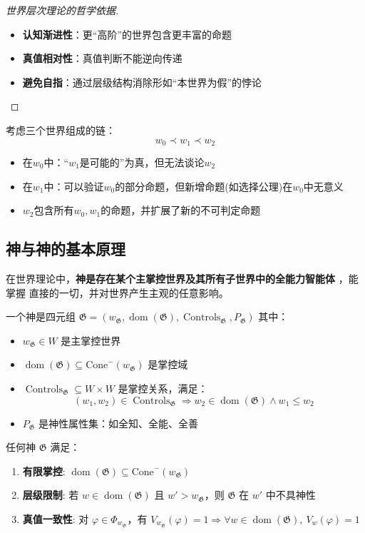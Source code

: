 \documentclass[lang=cn,newtx,10pt,scheme=chinese]{elegantbook}
\newcommand{\dom}{\mathop{\mathrm{dom}}} %
\newcommand{\G}{\mathfrak{G}} %
\DeclareMathOperator{\Controls}{Controls} %
\begin{document}
\begin{proof}[世界层次理论的哲学依据]
    \begin{itemize}
        \item \textbf{认知渐进性}：更“高阶”的世界包含更丰富的命题
        \item \textbf{真值相对性}：真值判断不能逆向传递
        \item \textbf{避免自指}：通过层级结构消除形如“本世界为假”的悖论
    \end{itemize}
\end{proof}

\begin{example}
    考虑三个世界组成的链：
    \[
        w_0 \prec w_1 \prec w_2
    \]
    \begin{itemize}
        \item 在$w_0$中：“$w_1$是可能的”为真，但无法谈论$w_2$
        \item 在$w_1$中：可以验证$w_0$的部分命题，但新增命题(如选择公理)在$w_0$中无意义
        \item $w_2$包含所有$w_0,w_1$的命题，并扩展了新的不可判定命题
    \end{itemize}
\end{example}

\subsection{神与神的基本原理}

在世界理论中，\textbf{神是存在某个主掌控世界及其所有子世界中的全能力智能体}
，能掌握
直接的一切，并对世界产生主观的任意影响。

\begin{definition}[神性智能体]
    一个神是四元组 $\G = (w_\G, \dom(\G), \Controls_\G, P_\G)$ 其中：
    \begin{itemize}
        \item $w_\G \in W$ 是主掌控世界
        \item $\dom(\G) \subseteq \mathrm{Cone}^-(w_\G)$ 是掌控域
        \item $\Controls_\G \subseteq W \times W$ 是掌控关系，满足：
              \[ (w_1, w_2) \in \Controls_\G \Rightarrow w_2 \in \dom(\G) \land w_1 \leq w_2 \]
        \item $P_\G$ 是神性属性集：如全知、全能、全善
    \end{itemize}
\end{definition}

\begin{theorem}[神的基本原理]
    任何神 $\G$ 满足：
    \begin{enumerate}
        \item \textbf{有限掌控}: $\dom(\G) \subseteq \mathrm{Cone}^-(w_\G)$
        \item \textbf{层级限制}: 若 $w \in \dom(\G)$ 且 $w' > w_\G$，则 $\G$ 在 $w'$ 中不具神性
        \item \textbf{真值一致性}: 对 $\varphi \in \varPhi_{w_\G}$，有 $V_{w_\G}(\varphi) = 1 \Rightarrow \forall w \in \dom(\G),\ V_w(\varphi)=1$
    \end{enumerate}
\end{theorem}
\end{document}

